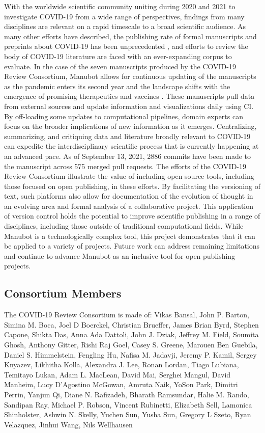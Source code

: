 \documentclass[twocolumn]{ceurart}
\begin{document}
With the worldwide scientific community uniting during 2020 and 2021 to investigate COVID-19 from a wide range of perspectives, findings from many disciplines are relevant on a rapid timescale to a broad scientific audience.
As many other efforts have described, the publishing rate of formal manuscripts and preprints about COVID-19 has been unprecedented \citep{7ub6VM4Z}, and efforts to review the body of COVID-19 literature are faced with an ever-expanding corpus to evaluate.
In the case of the seven manuscripts produced by the COVID-19 Review Consortium, Manubot allows for continuous updating of the manuscripts as the pandemic enters its second year and the landscape shifts with the emergence of promising therapeutics and vaccines \citep{cifK9B8t}.
These manuscripts pull data from external sources and update information and visualizations daily using CI.
By off-loading some updates to computational pipelines, domain experts can focus on the broader implications of new information as it emerges.
Centralizing, summarizing, and critiquing data and literature broadly relevant to COVID-19 can expedite the interdisciplinary scientific process that is currently happening at an advanced pace.
As of September 13, 2021, 2886 commits have been made to the manuscript across 575 merged pull requests.
The efforts of the COVID-19 Review Consortium illustrate the value of including open source tools, including those focused on open publishing, in these efforts.
By facilitating the versioning of text, such platforms also allow for documentation of the evolution of thought in an evolving area and formal analysis of a collaborative project.
This application of version control holds the potential to improve scientific publishing in a range of disciplines, including those outside of traditional computational fields.
While Manubot is a technologically complex tool, this project demonstrates that it can be applied to a variety of projects.
Future work can address remaining limitations and continue to advance Manubot as an inclusive tool for open publishing projects.

\hypertarget{consortium-members}{%
\subsection*{Consortium Members}\label{consortium-members}}

The COVID-19 Review Consortium is made of:
Vikas Bansal, John P. Barton, Simina M. Boca, Joel D Boerckel, Christian Brueffer, James Brian Byrd, Stephen Capone, Shikta Das, Anna Ada Dattoli, John J. Dziak, Jeffrey M. Field, Soumita Ghosh, Anthony Gitter, Rishi Raj Goel, Casey S. Greene, Marouen Ben Guebila, Daniel S. Himmelstein, Fengling Hu, Nafisa M. Jadavji, Jeremy P. Kamil, Sergey Knyazev, Likhitha Kolla, Alexandra J. Lee, Ronan Lordan, Tiago Lubiana, Temitayo Lukan, Adam L. MacLean, David Mai, Serghei Mangul, David Manheim, Lucy D'Agostino McGowan, Amruta Naik, YoSon Park, Dimitri Perrin, Yanjun Qi, Diane N. Rafizadeh, Bharath Ramsundar, Halie M. Rando, Sandipan Ray, Michael P. Robson, Vincent Rubinetti, Elizabeth Sell, Lamonica Shinholster, Ashwin N. Skelly, Yuchen Sun, Yusha Sun, Gregory L Szeto, Ryan Velazquez, Jinhui Wang, Nils Wellhausen
\end{document}
